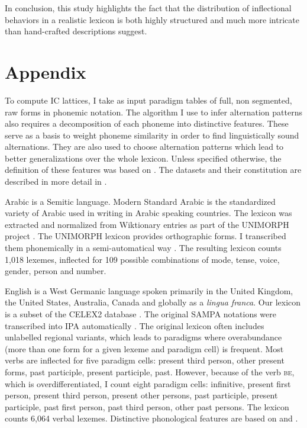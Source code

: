 \documentclass[output=paper]{langscibook}
\begin{document}
    In conclusion, this study highlights the fact that the distribution of inflectional behaviors in a realistic lexicon is both highly structured and much more intricate than hand-crafted descriptions suggest.
    
    \section*{Appendix}
    \label{Appendix:beniamine}

    To compute IC lattices, I take as input paradigm tables of full, non segmented, raw forms in phonemic notation. The algorithm I use to infer alternation patterns \citep{BeniaminePhd,Beniamine2017} also requires a decomposition of each phoneme into distinctive features. These serve as a basis to weight phoneme similarity in order to find linguistically sound alternations. They are also used to choose alternation patterns which lead to better generalizations over the whole lexicon. Unless specified otherwise, the definition of these features was based on \citet{HayesFeatures}. The datasets and their constitution are described in more detail in \citet{BeniaminePhd}.
    
    Arabic is a Semitic language. Modern Standard Arabic is the standardized variety of Arabic used in writing in Arabic speaking countries. The lexicon was extracted and normalized from Wiktionary entries as part of the UNIMORPH project \citep{KirovSylak-GlassmanQueYarowsky2016}. The UNIMORPH lexicon provides orthographic forms. I transcribed them phonemically in a semi-automatical way \citep[for more details, see][]{BeniaminePhd}. The resulting lexicon counts 1,018 lexemes, inflected for 109 possible combinations of mode, tense, voice, gender, person and number. 
    
    English is a West Germanic language spoken primarily in the United Kingdom, the United States, Australia, Canada and globally as a \textit{lingua franca}. Our lexicon is a subset of the CELEX2 database \citep{BaayenPiepenbrockGulikers1995}. The original SAMPA notations were transcribed into IPA automatically \citep{BeniaminePhd}. The original lexicon often includes unlabelled regional variants, which leads to paradigms where overabundance (more than one form for a given lexeme and paradigm cell) is frequent. Most verbs are inflected for five paradigm cells: present third person, other present forms, past participle, present participle, past. However, because of the verb \textsc{be}, which is overdifferentiated, I count eight paradigm cells: infinitive, present first person, present third person, present other persons, past participle, present participle, past first person, past third person, other past persons. The lexicon counts 6,064 verbal lexemes. Distinctive phonological features are based on \citet{HalleClements1983} and \citet{ChomskyHalle1968}.
    
\end{document}
